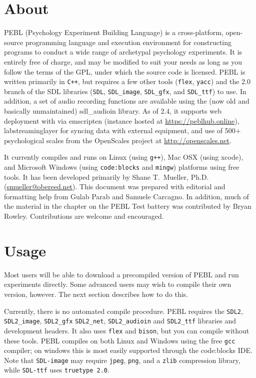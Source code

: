\chapter{About}

PEBL (Psychology Experiment Building Language) is a cross-platform,
open-source programming language and execution environment for
constructing programs to conduct a wide range of archetypal psychology
experiments. It is entirely free of charge, and may be modified to
suit your needs as long as you follow the terms of the GPL, under
which the source code is licensed. PEBL is written primarily in
\texttt{C++}, but requires a few other tools (\texttt{flex},
\texttt{yacc}) and the 2.0 branch of the SDL libraries (\texttt{SDL}, \texttt{SDL\_image},
\texttt{SDL\_gfx}, and \texttt{SDL\_ttf}) to use.  In addition, a set
of audio recording functions are available using the (now old and
basically unmaintained) sdl\_audioin library. As of 2.4, it supports web deployment with via emscripten (instance hosted at \url{https://peblhub.online}), labstreaminglayer for syncing data with external equipment, and use of 500+ psychological scales from the OpenScales project at \url{http://openscales.net}.


It currently compiles and runs on Linux (using \texttt{g++}), Mac OSX
(using xcode), and Microsoft Windows (using \texttt{code:blocks} and
\texttt{mingw}) platforms using free tools. It has been developed
primarily by Shane T.~Mueller,
Ph.D. (\href{mailto:smueller@obereed.net}{smueller@obereed.net}). This
document was prepared with editorial and formatting help from Gulab
Parab and Samuele Carcagno. In addition, much of the material in the chapter on the PEBL Test battery was contributed by Bryan Rowley. Contributions are welcome and encouraged.

\chapter{Usage}
Most users will be able to download a precompiled version of PEBL and
run experiments directly. Some advanced users may wish to compile
their own version, however.  The next section describes how to do this.


Currently, there is no automated compile procedure.  PEBL requires the
\texttt{SDL2}, \texttt{SDL2\_image}, \texttt{SDL2\_gfx} \texttt{SDL2\_net},
 \texttt{SDL2\_audioin} and
\texttt{SDL2\_ttf} libraries and development headers.  It also uses
\texttt{flex} and \texttt{bison}, but you can compile without these
tools. PEBL compiles on both Linux and Windows using the free
\texttt{gcc} compiler; on windows this is most easily supported through the code:blocks IDE. Note that \texttt{SDL-image} may require
\texttt{jpeg}, \texttt{png}, and a \texttt{zlib} compression library,
while \texttt{SDL-ttf} uses \texttt{truetype 2.0}.

